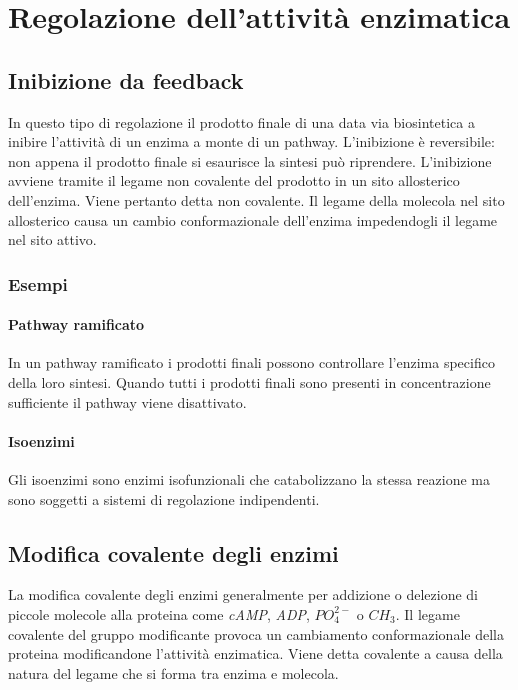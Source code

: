 \section{Regolazione dell'attività enzimatica}
	
	\subsection{Inibizione da feedback}
	In questo tipo di regolazione il prodotto finale di una data via biosintetica a inibire l'attivit\`a di un enzima a monte di un pathway.
	L'inibizione \`e reversibile: non appena il prodotto finale si esaurisce la sintesi pu\`o riprendere.
	L'inibizione avviene tramite il legame non covalente del prodotto in un sito allosterico dell'enzima.
	Viene pertanto detta non covalente.
	Il legame della molecola nel sito allosterico causa un cambio conformazionale dell'enzima impedendogli il legame nel sito attivo.

		\subsubsection{Esempi}

			\paragraph{Pathway ramificato}
			In un pathway ramificato i prodotti finali possono controllare l'enzima specifico della loro sintesi.
			Quando tutti i prodotti finali sono presenti in concentrazione sufficiente il pathway viene disattivato.

			\paragraph{Isoenzimi}
			Gli isoenzimi sono enzimi isofunzionali che catabolizzano la stessa reazione ma sono soggetti a sistemi di regolazione indipendenti.
	
	\subsection{Modifica covalente degli enzimi}
	La modifica covalente degli enzimi generalmente per addizione o delezione di piccole molecole alla proteina come \emph{cAMP}, \emph{ADP}, \emph{$PO_4^{2-}$} o \emph{$CH_3$}.
	Il legame covalente del gruppo modificante provoca un cambiamento conformazionale della proteina modificandone l'attività enzimatica. 
	Viene detta covalente a causa della natura del legame che si forma tra enzima e molecola.

